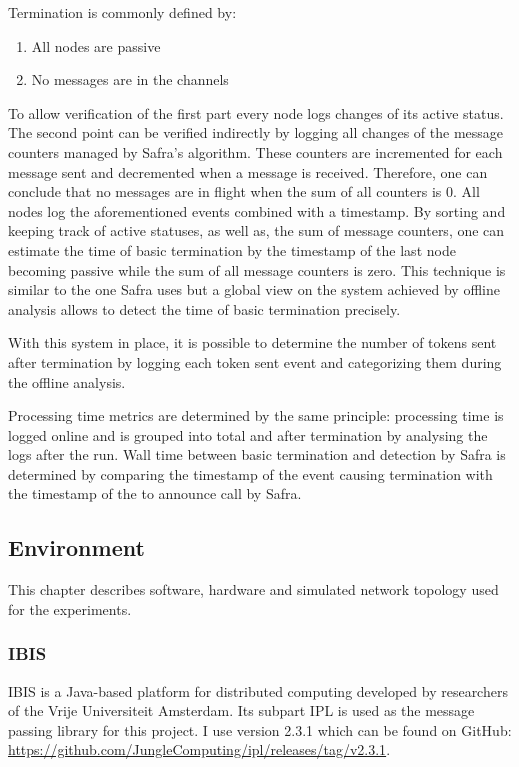 Termination is commonly defined by:
\begin{enumerate}
	\item All nodes are passive
	\item No messages are in the channels
\end{enumerate}
To allow verification of the first part every node logs changes of its active status.
The second point can be verified indirectly by logging all changes of the message counters managed by Safra's algorithm.
These counters are incremented for each message sent and decremented when a message is received.
Therefore, one can conclude that no messages are in flight when the sum of all counters is 0.
All nodes log the aforementioned events combined with a timestamp.
By sorting and keeping track of active statuses, as well as, the sum of message counters, one can estimate the time of basic termination by the timestamp of the last node becoming passive while the sum of all message counters is zero.
This technique is similar to the one Safra uses but a global view on the system achieved by offline analysis allows to detect the time of basic termination precisely.

With this system in place, it is possible to determine the number of tokens sent after termination by logging each token sent event and categorizing them during the offline analysis.

Processing time metrics are determined by the same principle: processing time is logged online and is grouped into total and after termination by analysing the logs after the run.
Wall time between basic termination and detection by Safra is determined by comparing the timestamp of the event causing termination with the timestamp of the to announce call by Safra.

\subsection{Environment}
This chapter describes software, hardware and simulated network topology used for the experiments.
\subsubsection{IBIS}
IBIS is a Java-based platform for distributed computing developed by researchers of the Vrije Universiteit Amsterdam. 
Its subpart IPL is used as the message passing library for this project. 
I use version 2.3.1 which can be found on GitHub: \href{https://github.com/JungleComputing/ipl/releases/tag/v2.3.1}{https://github.com/JungleComputing/ipl/releases/tag/v2.3.1}.

